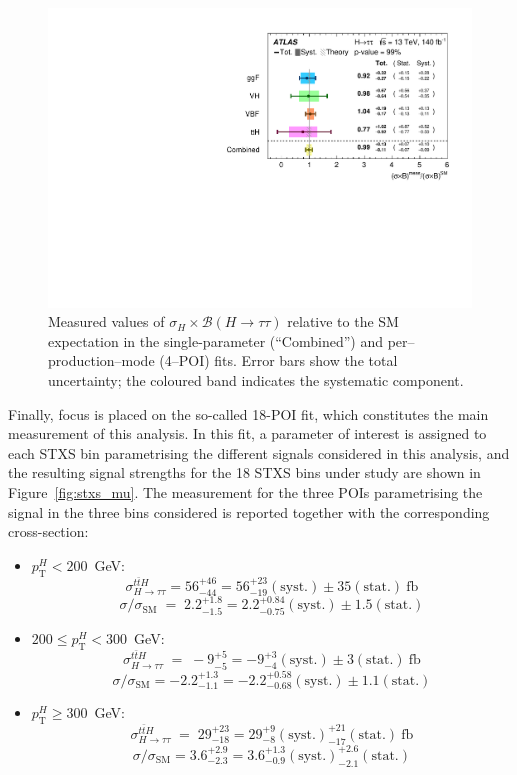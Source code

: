 \begin{figure}[htbp]
  \centering
  \includegraphics[width=0.75\linewidth]{images/fit_stxs/4_poi_stxs.pdf} %
  \caption{Measured values of \(\sigma_H \times \mathcal{B}(H\!\to\!\tau\tau)\) relative to the SM expectation
  in the single-parameter (``Combined'') and per–production–mode (4–POI) fits.
  Error bars show the total uncertainty; the coloured band indicates the systematic component.}
  \label{fig:permode_mu}
\end{figure}


Finally, focus is placed on the so-called 18-POI fit, which constitutes the main measurement of this analysis. In this fit, a parameter of interest is assigned to each STXS bin parametrising the different signals considered in this \htautau analysis, and the resulting signal strengths for the 18 STXS bins under study are shown in Figure~\ref{fig:stxs_mu}.
The measurement for the three POIs parametrising the \ttH signal in the three \pth bins considered is reported together with the corresponding cross-section:
\begin{itemize}
  \small
  \item $p_{\text{T}}^{H} < 200$~GeV:  
  \[
  \sigma^{t\bar{t}H}_{H \to \tau \tau} =56^{+46}_{-44} 
  = 56^{+23}_{-19}(\text{syst.})\pm 35(\text{stat.})~\text{fb}
  \]
  \[
  \sigma / \sigma_{\text{SM}} \;=\; 2.2^{+1.8}_{-1.5}=2.2^{+0.84}_{-0.75}(\text{syst.})\pm 1.5(\text{stat.})
  \]
  
  \item $200 \leq p_{\text{T}}^{H} < 300$~GeV:  
  \[
  \sigma^{t\bar{t}H}_{H \to \tau \tau} \;=\; -9^{+5}_{-5} 
  = -9^{+3}_{-4}(\text{syst.})\pm 3(\text{stat.}) ~\text{fb}
  \]
  \[
    \sigma / \sigma_{\text{SM}} =-2.2^{+1.3}_{-1.1}=-2.2^{+0.58}_{-0.68}(\text{syst.})\pm 1.1(\text{stat.})
  \]
  
  \item $p_{\text{T}}^{H} \geq 300$~GeV:  
  \[
  \sigma^{t\bar{t}H}_{H \to \tau \tau} \;=\; 29^{+23}_{-18} 
  = 29^{+9}_{-8}(\text{syst.})^{+21}_{-17}(\text{stat.})~\text{fb}
  \]
  \[
    \sigma / \sigma_{\text{SM}} =3.6^{+2.9}_{-2.3}=3.6^{+1.3}_{-0.9}(\text{syst.})^{+2.6}_{-2.1}(\text{stat.})
  \]
\end{itemize}


